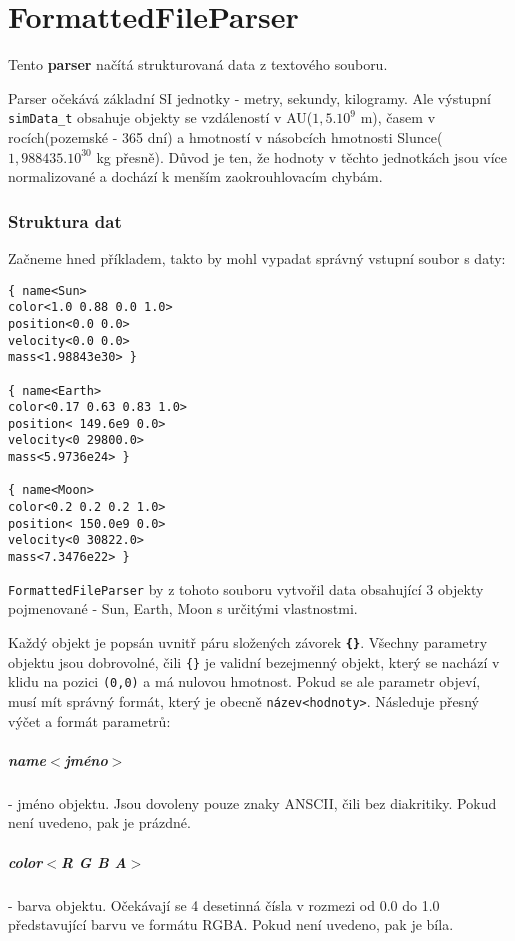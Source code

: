 \chapter{FormattedFileParser}
Tento \textbf{parser} načítá strukturovaná data z textového souboru. 

Parser očekává základní SI jednotky - metry, sekundy, kilogramy. Ale výstupní \texttt{simData\_t} obsahuje objekty se vzdáleností v AU($ 1,5.10^9 $ m), časem v rocích(pozemské - 365 dní) a hmotností v násobcích hmotnosti Slunce($ 1,988435.10^{30} $ kg přesně). Důvod je ten, že hodnoty v těchto jednotkách jsou více normalizované a dochází k menším zaokrouhlovacím chybám.

\subsection{Struktura dat}
Začneme hned příkladem, takto by mohl vypadat správný vstupní soubor s daty:
\begin{lstlisting}
{ name<Sun>
color<1.0 0.88 0.0 1.0>
position<0.0 0.0>
velocity<0.0 0.0>
mass<1.98843e30> }

{ name<Earth>
color<0.17 0.63 0.83 1.0>
position< 149.6e9 0.0>
velocity<0 29800.0>
mass<5.9736e24> }

{ name<Moon>
color<0.2 0.2 0.2 1.0>
position< 150.0e9 0.0>
velocity<0 30822.0>
mass<7.3476e22> }
\end{lstlisting}
\texttt{FormattedFileParser} by z tohoto souboru vytvořil data obsahující 3 objekty pojmenované - Sun, Earth, Moon s určitými vlastnostmi.

Každý objekt je popsán uvnitř páru složených závorek \textbf{\texttt{\{\}}}.
Všechny parametry objektu jsou dobrovolné, čili \lstinline|{}| je validní bezejmenný objekt, který se nachází v klidu na pozici \texttt{(0,0)} a má nulovou hmotnost. Pokud se ale parametr objeví, musí mít správný formát, který je obecně \texttt{název<hodnoty>}. Následuje přesný výčet a formát parametrů:
\paragraph{name$ < $jméno$ > $ } - jméno objektu. Jsou dovoleny pouze znaky ANSCII, čili bez diakritiky. Pokud není uvedeno, pak je prázdné.
\paragraph{color$ < $R G B A$ > $} - barva objektu. Očekávají se 4 desetinná čísla v rozmezi od 0.0 do 1.0 představující barvu ve formátu RGBA. Pokud není uvedeno, pak je bíla.
